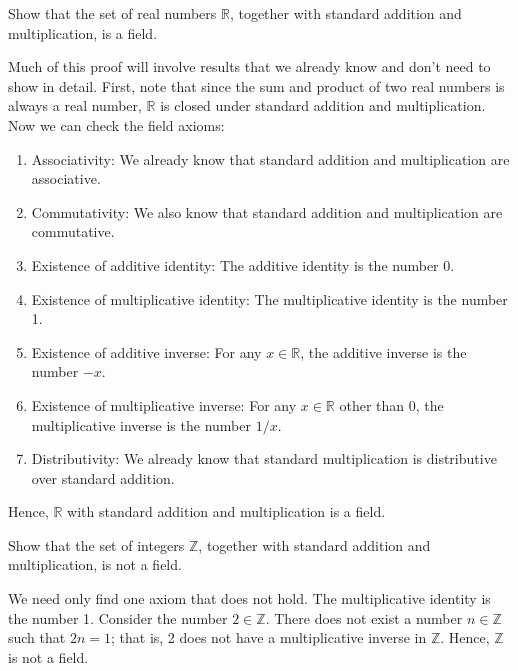 \begin{exmp}
Show that the set of real numbers $ \mathbb{R} $, together with standard addition and multiplication, is a field.
\end{exmp}
\begin{sltn}
Much of this proof will involve results that we already know and don't need to show in detail. First, note that since the sum and product of two real numbers is always a real number, $ \mathbb{R} $ is closed under standard addition and multiplication. Now we can check the field axioms:
\begin{enumerate}
    \item Associativity: We already know that standard addition and multiplication are associative.

    \item Commutativity: We also know that standard addition and multiplication are commutative.

    \item Existence of additive identity: The additive identity is the number 0.
    
    \item Existence of multiplicative identity: The multiplicative identity is the number 1.
    
    \item Existence of additive inverse: For any $ x\in\mathbb{R} $, the additive inverse is the number $ -x $.
    
    \item Existence of multiplicative inverse: For any $ x\in\mathbb{R} $ other than 0, the multiplicative inverse is the number $ 1/x $.
    
    \item Distributivity: We already know that standard multiplication is distributive over standard addition.
\end{enumerate}
Hence, $ \mathbb{R} $ with standard addition and multiplication is a field.
\end{sltn}

\begin{exmp}
Show that the set of integers $ \mathbb{Z} $, together with standard addition and multiplication, is not a field.
\end{exmp}
\begin{sltn}
We need only find one axiom that does not hold. The multiplicative identity is the number 1. Consider the number $ 2\in\mathbb{Z} $. There does not exist a number $ n\in\mathbb{Z} $ such that $ 2n=1 $; that is, 2 does not have a multiplicative inverse in $ \mathbb{Z} $. Hence, $ \mathbb{Z} $ is not a field.
\end{sltn}

